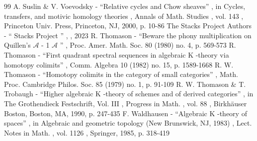 \documentclass[11pt]{article}
\theoremstyle{plain}
\theoremstyle{definition}
\begin{document}
\begin{thebibliography}{99}
 A. Suslin \& V. Voevodsky - “Relative cycles and Chow sheaves” , in Cycles, transfers, and motivic homology theories , Annals of Math. Studies , vol. 143 , Princeton Univ. Press, Princeton, NJ, 2000, p. 10-86
 The Stacks Project Authors - “ Stacks Project ” , , 2023
 R. Thomason - “Beware the phony multiplication on Quillen’s $\mathcal{A}$ - 1 $\mathcal{A}$ ” , Proc. Amer. Math. Soc. 80 (1980) no. 4, p. 569-573
 R. Thomason - “First quadrant spectral sequences in algebraic K -theory via homotopy colimits” , Comm. Algebra 10 (1982) no. 15, p. 1589-1668
 R. W. Thomason - “Homotopy colimits in the category of small categories” , Math. Proc. Cambridge Philos. Soc. 85 (1979) no. 1, p. 91-109
 R. W. Thomason \& T. Trobaugh - “Higher algebraic K -theory of schemes and of derived categories” , in The Grothendieck Festschrift, Vol. III , Progress in Math. , vol. 88 , Birkhäuser Boston, Boston, MA, 1990, p. 247-435
 F. Waldhausen - “Algebraic K -theory of spaces” , in Algebraic and geometric topology (New Brunswick, NJ, 1983) , Lect. Notes in Math. , vol. 1126 , Springer, 1985, p. 318-419
\end{thebibliography}
\end{document}
